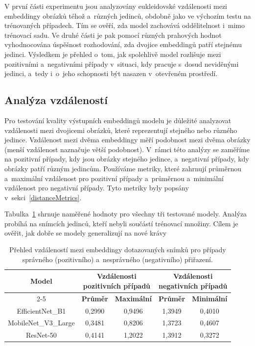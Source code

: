 V první části experimentu jsou analyzovány eukleidovské vzdálenosti mezi embeddingy obrázků téhož a~různých jedinců, obdobně jako ve výchozím testu na trénovaných případech. Tím se ověří, zda model zachovává oddělitelnost i~mimo trénovací sadu. Ve druhé části je pak pomocí různých prahových hodnot vyhodnocována úspěšnost rozhodování, zda dvojice embeddingů patří stejnému jedinci. Výsledkem je přehled o~tom, jak spolehlivě model rozlišuje mezi pozitivními a~negativními případy v~situaci, kdy pracuje s~dosud neviděnými jedinci, a~tedy i~o~jeho schopnosti být nasazen v~otevřeném prostředí.


\subsection*{Analýza vzdáleností}
Pro testování kvality výstupních embeddingů modelu je důležité analyzovat vzdálenosti mezi dvojicemi obrázků, které reprezentují stejného nebo různého jedince. Vzdálenost mezi dvěma embeddingy měří podobnost mezi dvěma obrázky (menší vzdálenost naznačuje větší podobnost). V~rámci této analýzy se zaměříme na pozitivní případy, kdy jsou obrázky stejného jedince, a~negativní případy, kdy obrázky patří různým jedincům. Používáme metriky, které zahrnují průměrnou a~maximální vzdálenost pro pozitivní případy a~průměrnou a~minimální vzdálenost pro negativní případy. Tyto metriky byly popsány v~sekci~\ref{distanceMetrics}.


Tabulka~\ref{newCowDistances} shrnuje naměřené hodnoty pro všechny tři testované modely. Analýza probíhá na snímcích jedinců, kteří nebyli součástí trénovací množiny. Cílem je ověřit, jak dobře se modely generalizují na nové krávy

\begin{table}[H]
	\centering
	\begin{tabular}{|c|c|c|c|c|}
		\hline
		\multirow{2}{*}{\textbf{Model}} & 
		\multicolumn{2}{c|}{\parbox[c][3em][c]{4.5cm}{\centering \textbf{Vzdálenosti}\\\textbf{pozitivních případů}}} & 
		\multicolumn{2}{c|}{\parbox[c][3em][c]{4.5cm}{\centering \textbf{Vzdálenosti}\\\textbf{negativních případů}}} \\
		\cline{2-5}
		& \textbf{\centering Průměr} & \textbf{\centering Maximální} & \textbf{\centering Průměr} & \textbf{\centering Minimální} \\
		\hline
		EfficientNet\_B1 & 0,2990 & 0,9496 & 1,3949 & 0,4010 \\
		MobileNet\_V3\_Large & 0,3481 & 0,8206 & 1,3723 & 0,4607 \\
		ResNet-50 & 0,4141 & 1,2022 & 1,3912 & 0,3272 \\
		\hline
	\end{tabular}
	\caption{Přehled vzdáleností mezi embeddingy dotazovaných snímků pro případy správného (pozitivního) a~nesprávného (negativního) přiřazení.}
	\label{newCowDistances}
\end{table}

